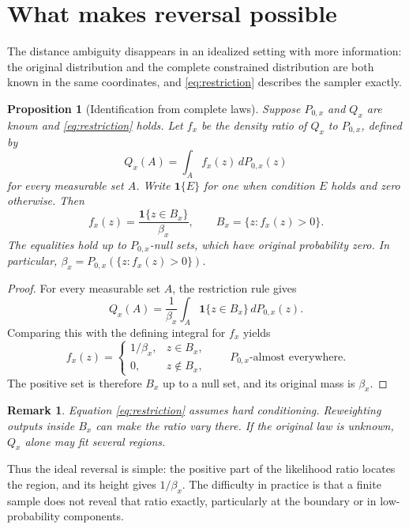 \documentclass[10pt,letterpaper]{article}
\theoremstyle{typed}
\newtheorem{proposition}[lemma]{Proposition}
\newtheorem{remark}[lemma]{Remark}
\begin{document}
\section{What makes reversal possible}

The distance ambiguity disappears in an idealized setting with more information: the original distribution and the complete constrained distribution are both known in the same coordinates, and \eqref{eq:restriction} describes the sampler exactly.

\begin{proposition}[Identification from complete laws]
Suppose $P_{0,x}$ and $Q_x$ are known and \eqref{eq:restriction} holds. Let $f_x$ be the density ratio of $Q_x$ to $P_{0,x}$, defined by
\[
  Q_x(A)=\int_A f_x(z)\,dP_{0,x}(z)
\]
for every measurable set $A$. Write $\mathbf{1}\{E\}$ for one when condition $E$ holds and zero otherwise. Then
\begin{equation}
  f_x(z)=\frac{\mathbf{1}\{z\in B_x\}}{\beta_x},\qquad
  B_x=\{z:f_x(z)>0\}.
  \label{eq:ratio}
\end{equation}
The equalities hold up to $P_{0,x}$-null sets, which have original probability zero. In particular, $\beta_x=P_{0,x}(\{z:f_x(z)>0\})$.
\end{proposition}
\begin{proof}
For every measurable set $A$, the restriction rule gives
\[
  Q_x(A)
  =\frac{1}{\beta_x}\int_A \mathbf{1}\{z\in B_x\}\,dP_{0,x}(z).
\]
Comparing this with the defining integral for $f_x$ yields
\[
  f_x(z)=
  \begin{cases}
    1/\beta_x,&z\in B_x,\\
    0,&z\notin B_x,
  \end{cases}
  \qquad P_{0,x}\text{-almost everywhere}.
\]
The positive set is therefore $B_x$ up to a null set, and its original mass is $\beta_x$.
\end{proof}

\begin{remark}
Equation \eqref{eq:restriction} assumes hard conditioning. Reweighting outputs inside $B_x$ can make the ratio vary there. If the original law is unknown, $Q_x$ alone may fit several regions.
\end{remark}

Thus the ideal reversal is simple: the positive part of the likelihood ratio locates the region, and its height gives $1/\beta_x$. The difficulty in practice is that a finite sample does not reveal that ratio exactly, particularly at the boundary or in low-probability components.
\end{document}
